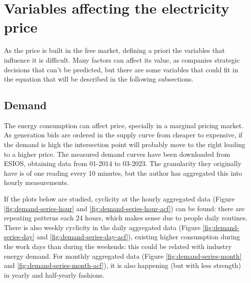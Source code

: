 \section{Variables affecting the electricity price}
As the price is built in the free market, defining a priori the variables that influence it is difficult.
Many factors can affect its value, as companies strategic decisions that can't be predicted, but there are some variables that could fit in the equation that will be described in the following subsections. \cite{mercado-electrico-periodico-energia, mercado-electrico-cambio-energetico}

\subsection{Demand}
The energy consumption can affect price, specially in a marginal pricing market.
As generation bids are ordered in the supply curve from cheaper to expensive, if the demand is high the intersection point will probably move to the right leading to a higher price.
The measured demand curves have been downloaded from ESIOS, obtaining data from 01-2014 to 03-2023. The granularity they originally have is of one reading every 10 minutes, but the author has aggregated this into hourly measurements.

If the plots below are studied, cyclicity at the hourly aggregated data (Figure \ref{fig:demand-series-hour} and \ref{fig:demand-series-hour-acf}) can be found: there are repeating patterns each 24 hours, which makes sense due to people daily routines. There is also weekly cyclicity in the daily aggregated data (Figure \ref{fig:demand-series-day} and \ref{fig:demand-series-day-acf}), existing higher consumption during the work days than during the weekends: this could be related with industry energy demand. For monthly aggregated data (Figure \ref{fig:demand-series-month} and \ref{fig:demand-series-month-acf}), it is also happening (but with less strength) in yearly and half-yearly fashions.

